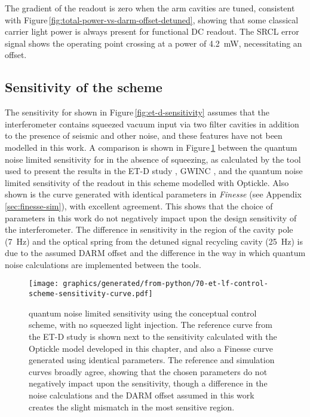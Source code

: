 The gradient of the \ASDC{} readout is zero when the arm cavities are tuned, consistent with Figure\,\ref{fig:total-power-vs-darm-offset-detuned}, showing that some classical carrier light power is always present for functional \gls{DC} readout. The \gls{SRCL} error signal shows the operating point crossing at a power of \SI{4.2}{\milli\watt}, necessitating an offset.

\subsection{Sensitivity of the scheme}
The sensitivity for \ETLF{} shown in Figure\,\ref{fig:et-d-sensitivity} assumes that the interferometer contains squeezed vacuum input via two filter cavities in addition to the presence of seismic and other noise, and these features have not been modelled in this work. A comparison is shown in Figure\,\ref{fig:et-lf-control-scheme-sensitivity} between the quantum noise limited sensitivity for \ETLF{} in the absence of squeezing, as calculated by the tool used to present the results in the ET-D study \cite{Hild2011}, \gls{GWINC} \cite{gwinc}, and the quantum noise limited sensitivity of the \ASDC{} readout in this scheme modelled with Optickle. Also shown is the curve generated with identical parameters in \emph{Finesse} (see Appendix\,\ref{sec:finesse-sim}), with excellent agreement. This shows that the choice of parameters in this work do not negatively impact upon the design sensitivity of the interferometer. The difference in sensitivity in the region of the cavity pole (\SI{7}{\hertz}) and the optical spring from the detuned signal recycling cavity (\SI{25}{\hertz}) is due to the assumed \gls{DARM} offset and the difference in the way in which quantum noise calculations are implemented between the tools.

\begin{figure}
  \centering
  \texttt{[image: graphics/generated/from-python/70-et-lf-control-scheme-sensitivity-curve.pdf]}
  \caption[ET-LF quantum noise limited sensitivity using the conceptual control scheme]{\label{fig:et-lf-control-scheme-sensitivity}\ETLF{} quantum noise limited sensitivity using the conceptual control scheme, with no squeezed light injection. The reference curve from the ET-D study is shown next to the sensitivity calculated with the Optickle model developed in this chapter, and also a Finesse curve generated using identical parameters. The reference and simulation curves broadly agree, showing that the chosen parameters do not negatively impact upon the sensitivity, though a difference in the noise calculations and the \gls{DARM} offset assumed in this work creates the slight mismatch in the most sensitive region.}
\end{figure}

